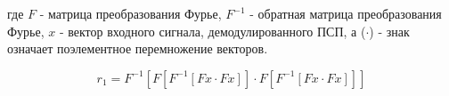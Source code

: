 где ${F}$ - матрица преобразования Фурье, ${F^{-1}}$ - обратная матрица преобразования Фурье, ${x}$ - вектор входного сигнала,
демодулированного ПСП, а (${\cdot{}}$) - знак означает поэлементное перемножение векторов.

\begin{center}
\begin{equation}
	r_1 = F^{-1} \left[ F\left[F^{-1}\left[Fx \cdot Fx\right]\right] \cdot F\left[F^{-1}\left[Fx \cdot Fx\right]\right] \right]
\end{equation}
\end{center}

\newpage
